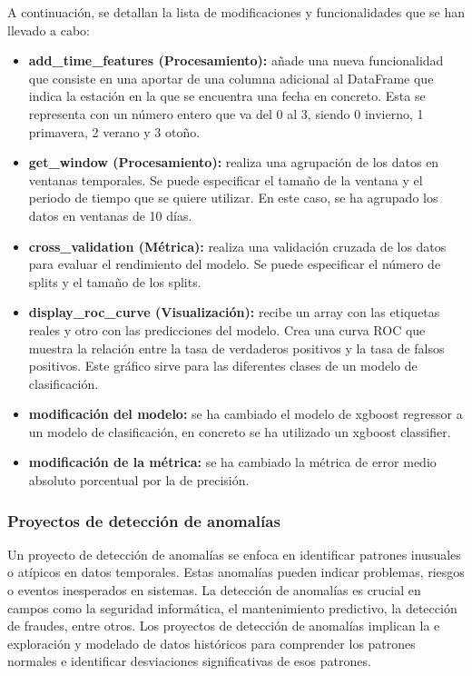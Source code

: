 A continuación, se detallan la lista de modificaciones y funcionalidades que se han llevado a cabo:

\begin{itemize}
    \item \textbf{add\_time\_features (Procesamiento):} añade una nueva funcionalidad que
    consiste en una aportar de una columna adicional al DataFrame que indica
    la estación en la que se encuentra una fecha en concreto. Esta se representa con un número entero
    que va del 0 al 3, siendo 0 invierno, 1 primavera, 2 verano y 3 otoño.
    \item \textbf{get\_window (Procesamiento):} realiza una agrupación de los datos en ventanas
    temporales. Se puede especificar el tamaño de la ventana y el periodo de tiempo que se quiere
    utilizar. En este caso, se ha agrupado los datos en ventanas de 10 días.
    \item \textbf{cross\_validation (Métrica):} realiza una validación cruzada de los datos
    para evaluar el rendimiento del modelo. Se puede especificar el número de splits y el tamaño
    de los splits. 
    \item \textbf{display\_roc\_curve (Visualización):} recibe un array con las etiquetas reales
    y otro con las predicciones del modelo. Crea una curva ROC que muestra la relación entre
    la tasa de verdaderos positivos y la tasa de falsos positivos. Este gráfico sirve para
    las diferentes clases de un modelo de clasificación.
    \item \textbf{modificación del modelo:} se ha cambiado el modelo de xgboost regressor a un modelo de
    clasificación, en concreto se ha utilizado un xgboost classifier. 
    \item \textbf{modificación de la métrica:} se ha cambiado la métrica de error medio absoluto porcentual
    por la de precisión.
\end{itemize}


\subsubsection{Proyectos de detección de anomalías}
Un proyecto de detección de anomalías se enfoca en identificar patrones inusuales o 
atípicos en datos temporales. Estas anomalías pueden indicar problemas, riesgos o 
eventos inesperados en sistemas. La detección de anomalías 
es crucial en campos como la seguridad informática, el mantenimiento predictivo, la 
detección de fraudes, entre otros. Los proyectos de detección de anomalías implican la e
exploración y modelado de datos históricos para comprender los patrones normales e identificar 
desviaciones significativas de esos patrones. 

